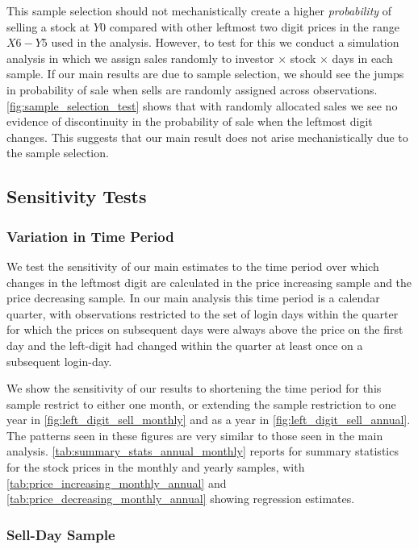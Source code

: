 This sample selection should not mechanistically create a higher \textit{probability} of selling a stock at $Y0$ compared with other leftmost two digit prices in the range $X6 - Y5$ used in the analysis. However, to test for this we conduct a simulation analysis in which we assign sales randomly to investor $\times$ stock $\times$ days in each sample. If our main results are due to sample selection, we should see the jumps in probability of sale when sells are randomly assigned across observations. \ref{fig:sample_selection_test} shows that with randomly allocated sales we see no evidence of discontinuity in the probability of sale when the leftmost digit changes. This suggests that our main result does not arise mechanistically due to the sample selection.

\subsection{Sensitivity Tests}

\subsubsection{Variation in Time Period}

We test the sensitivity of our main estimates to the time period over which changes in the leftmost digit are calculated in the price increasing sample and the price decreasing sample. In our main analysis this time period is a calendar quarter, with observations restricted to the set of login days within the quarter for which the prices on subsequent days were always above the price on the first day and the left-digit had changed within the quarter at least once on a subsequent login-day. 

We show the sensitivity of our results to shortening the time period for this sample restrict to either one month, or extending the sample restriction to one year in \ref{fig:left_digit_sell_monthly} and as a year in \ref{fig:left_digit_sell_annual}. The patterns seen in these figures are very similar to those seen in the main analysis. \ref{tab:summary_stats_annual_monthly} reports for summary statistics for the stock prices in the monthly and yearly samples, with \ref{tab:price_increasing_monthly_annual} and \ref{tab:price_decreasing_monthly_annual} showing regression estimates.

\subsubsection{Sell-Day Sample}

